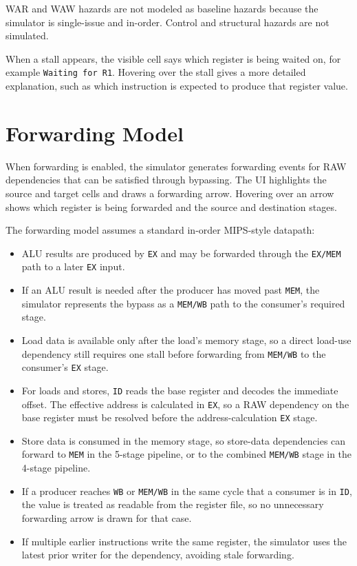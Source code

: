 \documentclass[11pt,a4paper]{article}
\begin{document}
WAR and WAW hazards are not modeled as baseline hazards because the simulator is single-issue and in-order. Control and structural hazards are not simulated.

When a stall appears, the visible cell says which register is being waited on, for example \texttt{Waiting for R1}. Hovering over the stall gives a more detailed explanation, such as which instruction is expected to produce that register value.

\section{Forwarding Model}

When forwarding is enabled, the simulator generates forwarding events for RAW dependencies that can be satisfied through bypassing. The UI highlights the source and target cells and draws a forwarding arrow. Hovering over an arrow shows which register is being forwarded and the source and destination stages.

The forwarding model assumes a standard in-order MIPS-style datapath:

\begin{itemize}[leftmargin=*]
    \item ALU results are produced by \texttt{EX} and may be forwarded through the \texttt{EX/MEM} path to a later \texttt{EX} input.
    \item If an ALU result is needed after the producer has moved past \texttt{MEM}, the simulator represents the bypass as a \texttt{MEM/WB} path to the consumer's required stage.
    \item Load data is available only after the load's memory stage, so a direct load-use dependency still requires one stall before forwarding from \texttt{MEM/WB} to the consumer's \texttt{EX} stage.
    \item For loads and stores, \texttt{ID} reads the base register and decodes the immediate offset. The effective address is calculated in \texttt{EX}, so a RAW dependency on the base register must be resolved before the address-calculation \texttt{EX} stage.
    \item Store data is consumed in the memory stage, so store-data dependencies can forward to \texttt{MEM} in the 5-stage pipeline, or to the combined \texttt{MEM/WB} stage in the 4-stage pipeline.
    \item If a producer reaches \texttt{WB} or \texttt{MEM/WB} in the same cycle that a consumer is in \texttt{ID}, the value is treated as readable from the register file, so no unnecessary forwarding arrow is drawn for that case.
    \item If multiple earlier instructions write the same register, the simulator uses the latest prior writer for the dependency, avoiding stale forwarding.
\end{itemize}
\end{document}
